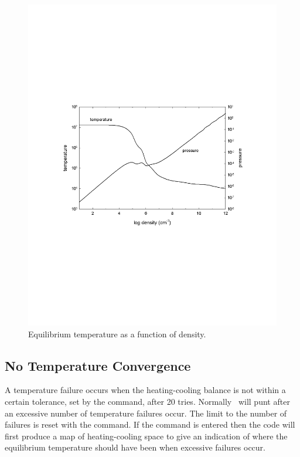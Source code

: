 \begin{figure}
\centering
\includegraphics[scale=0.8]{hazy_kmt}
\caption[Temperature vs density in photoionization equilibrium]{\label{fig:hazy_kmt}Equilibrium temperature as a function of density.}
\end{figure}

\subsection{No Temperature Convergence}

A temperature failure occurs when the heating-cooling balance is not
within a certain tolerance,
set by the  command,
after 20 tries.
Normally \Cloudy\ will punt after an excessive number of temperature
failures occur.
The limit to the number of failures is reset with the
 command.
If the  command is entered then the code
will first produce a map of heating-cooling space to give an indication
of where the equilibrium temperature should have been when excessive
failures occur.

